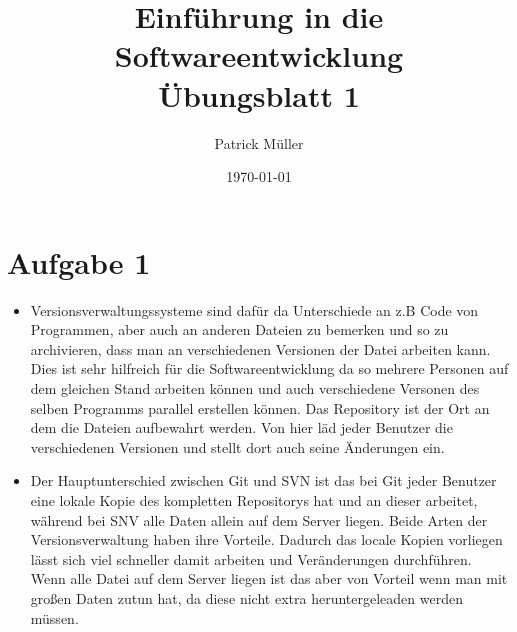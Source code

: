 \documentclass [DIN,DIV=14,pagenumber=false,parskip=full,fromalign=left,%
fontsize=12pt,%
subject=beforeopening] {scrartcl}
\title{Einführung in die Softwareentwicklung \\
Übungsblatt 1}
\author{Patrick Müller}
\date{\today}
\begin{document}
\thispagestyle{fancy}
\maketitle

\section*{Aufgabe 1}
\begin{itemize}
\item Versionsverwaltungssysteme sind dafür da Unterschiede an z.B Code von Programmen, aber auch an anderen Dateien zu bemerken und so zu archivieren, dass man an verschiedenen Versionen der Datei arbeiten kann. Dies ist sehr hilfreich für die Softwareentwicklung da so mehrere Personen auf dem gleichen Stand arbeiten können und auch verschiedene Versonen des selben Programms parallel erstellen können. Das Repository ist der Ort an dem die Dateien aufbewahrt werden. Von hier läd jeder Benutzer die verschiedenen Versionen und stellt dort auch seine Änderungen ein.
\end{itemize}

\begin{itemize}
\item Der Hauptunterschied zwischen Git und SVN ist das bei Git jeder Benutzer eine lokale Kopie des kompletten Repositorys hat und an dieser arbeitet, während bei SNV alle Daten allein auf dem Server liegen. Beide Arten der Versionsverwaltung haben ihre Vorteile. Dadurch das locale Kopien vorliegen lässt sich viel schneller damit arbeiten und Veränderungen durchführen. Wenn alle Datei auf dem Server liegen ist das aber von Vorteil wenn man mit großen Daten zutun hat, da diese nicht extra heruntergeleaden werden müssen.
\end{itemize}
\end{document}
